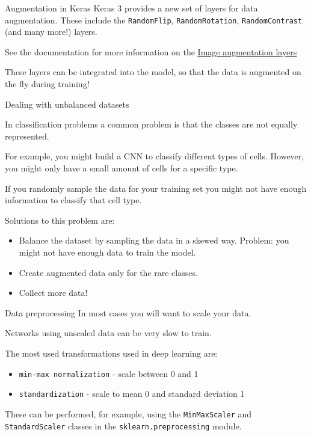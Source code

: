 \documentclass[9pt, aspectratio=169]{beamer}
\begin{document}
\begin{frame}
    {Augmentation in Keras}
    Keras 3 provides a new set of layers for data augmentation.
    These include the \texttt{RandomFlip}, \texttt{RandomRotation}, \texttt{RandomContrast} (and many more!) layers.

    See the documentation for more information on the \href{https://keras.io/api/layers/preprocessing_layers/image_augmentation/}{\underline{Image augmentation layers}}

    \pause
    These layers can be integrated into the model, so that the data is augmented on the fly during training!
\end{frame}

\begin{frame}
    {Dealing with unbalanced datasets}

    In classification problems a common problem is that the classes are not equally represented.

    For example, you might build a CNN to classify different types of cells. However, you might only have a small amount of cells for a specific type.
    
    If you randomly sample the data for your training set you might not have enough information to classify that cell type.

    Solutions to this problem are:

    \begin{itemize}
        \item Balance the dataset by sampling the data in a skewed way. Problem: you might not have enough data to train the model.
        \item Create augmented data only for the rare classes.
        \item Collect more data! 
    \end{itemize}
\end{frame}

\begin{frame}
    {Data preprocessing}
    In most cases you will want to scale your data.

    Networks using unscaled data can be very slow to train.

    The most used transformations used in deep learning are:

    \begin{itemize}
        \item \texttt{min-max normalization} - scale between 0 and 1
        \item \texttt{standardization} - scale to mean 0 and standard deviation 1
    \end{itemize}

    These can be performed, for example, using the \texttt{MinMaxScaler} and \texttt{StandardScaler} classes in the \texttt{sklearn.preprocessing} module.
\end{frame}
\end{document}

